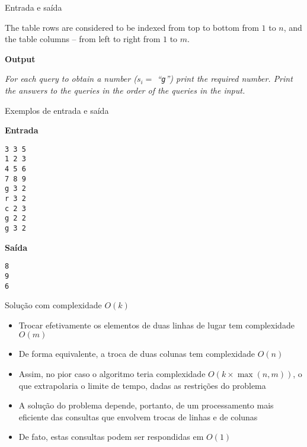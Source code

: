\begin{frame}[fragile]{Entrada e saída}

The table rows are considered to be indexed from top to bottom from $1$ to $n$, and the table columns -- from left to right from $1$ to $m$.

\vspace{0.2in}

\textbf{Output}

{\it
For each query to obtain a number ($s_i =$ ``\texttt{g}'') print the required number. Print the answers to the queries in the order of the queries in the input.
}

\end{frame}

\begin{frame}[fragile]{Exemplos de entrada e saída}

\begin{minipage}[t]{0.45\textwidth}
\textbf{Entrada}
\begin{verbatim}
3 3 5
1 2 3
4 5 6
7 8 9
g 3 2
r 3 2
c 2 3
g 2 2
g 3 2
\end{verbatim}
\end{minipage}
\begin{minipage}[t]{0.5\textwidth}
\textbf{Saída}
\begin{verbatim}
8
9
6
\end{verbatim}
\end{minipage}

\end{frame}


\begin{frame}[fragile]{Solução com complexidade $O(k)$}

    \begin{itemize}
        \item Trocar efetivamente os elementos de duas linhas de lugar tem complexidade $O(m)$

        \item De forma equivalente, a troca de duas colunas tem complexidade $O(n)$

        \item Assim, no pior caso o algoritmo teria complexidade $O(k\times \max(n, m))$, o que 
            extrapolaria o limite de tempo, dadas as restrições do problema

        \item A solução do problema depende, portanto, de um processamento mais eficiente das
            consultas que envolvem trocas de linhas e de colunas

        \item De fato, estas consultas podem ser respondidas em $O(1)$
    \end{itemize}

\end{frame}

